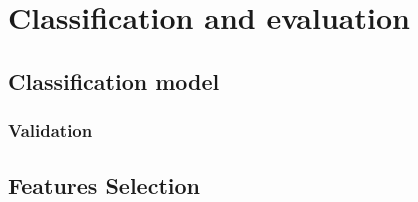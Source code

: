 \chapter{Classification and evaluation}
\section{Classification model}
\subsection{Validation}
\section{Features Selection}
